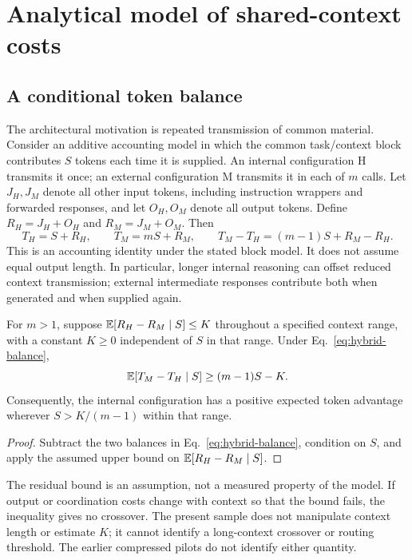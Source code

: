 \section{Analytical model of shared-context costs}
\label{sec:hybrid-accounting}

\subsection{A conditional token balance}
The architectural motivation is repeated transmission of common material. Consider an additive accounting model in which the common task/context block contributes $S$ tokens each time it is supplied. An internal configuration H transmits it once; an external configuration M transmits it in each of $m$ calls. Let $J_H,J_M$ denote all other input tokens, including instruction wrappers and forwarded responses, and let $O_H,O_M$ denote all output tokens. Define $R_H=J_H+O_H$ and $R_M=J_M+O_M$. Then
\begin{equation}
T_H=S+R_H,\qquad T_M=mS+R_M,
\qquad T_M-T_H=(m-1)S+R_M-R_H.
\label{eq:hybrid-balance}
\end{equation}
This is an accounting identity under the stated block model. It does not assume equal output length. In particular, longer internal reasoning can offset reduced context transmission; external intermediate responses contribute both when generated and when supplied again.

\begin{proposition}
\label{prop:hybrid-bound}
For $m>1$, suppose $\mathbb{E}[R_H-R_M\mid S]\le K$ throughout a specified context range, with a constant $K\ge0$ independent of $S$ in that range. Under Eq.~\eqref{eq:hybrid-balance},
\[
\mathbb{E}[T_M-T_H\mid S]\ge(m-1)S-K.
\]
Consequently, the internal configuration has a positive expected token advantage wherever $S>K/(m-1)$ within that range.
\end{proposition}
\begin{proof}
Subtract the two balances in Eq.~\eqref{eq:hybrid-balance}, condition on $S$, and apply the assumed upper bound on $\mathbb{E}[R_H-R_M\mid S]$.
\end{proof}

The residual bound is an assumption, not a measured property of the model. If output or coordination costs change with context so that the bound fails, the inequality gives no crossover. The present sample does not manipulate context length or estimate $K$; it cannot identify a long-context crossover or routing threshold. The earlier compressed pilots do not identify either quantity.

